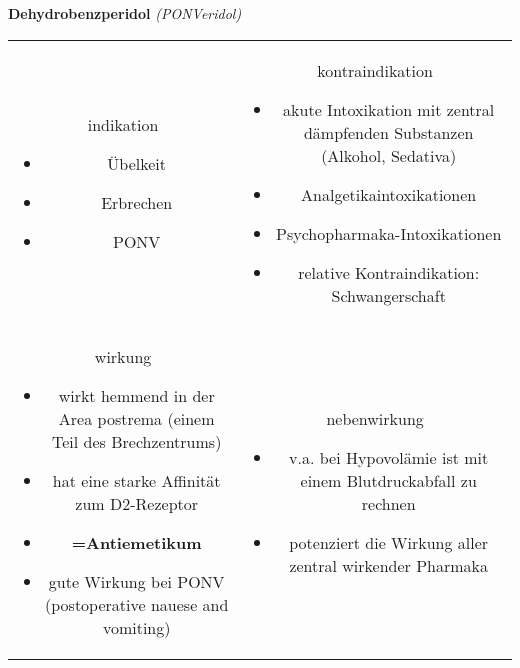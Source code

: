 \begin{frame}{
    \textbf{Dehydrobenzperidol}
    \textit{(PONVeridol)}
}
    \begin{tabular}{c c}
        \begin{beamercolorbox}[wd=\boxwidth\textwidth,ht=\boxheight\textheight,sep=1em]{indikation}
            \begin{itemize}
                \item Übelkeit
                \item Erbrechen
                \item PONV
            \end{itemize}
        \end{beamercolorbox} & 
        \begin{beamercolorbox}[wd=\boxwidth\textwidth,ht=\boxheight\textheight,sep=1em]{kontraindikation}
            \begin{itemize}
                \item akute Intoxikation mit zentral dämpfenden Substanzen (Alkohol, Sedativa) 
                \item Analgetikaintoxikationen
                \item Psychopharmaka-Intoxikationen
                \item relative Kontraindikation: Schwangerschaft
            \end{itemize}
        \end{beamercolorbox} \\
        \begin{beamercolorbox}[wd=\boxwidth\textwidth,ht=\boxheight\textheight,sep=1em]{wirkung}
            \begin{itemize}
                \item wirkt hemmend in der Area postrema (einem Teil des Brechzentrums)
                \item hat eine starke Affinität zum D2-Rezeptor
                \item \textbf{=Antiemetikum}
                \item gute Wirkung bei PONV (postoperative nauese and vomiting)
            \end{itemize}
        \end{beamercolorbox} & 
        \begin{beamercolorbox}[wd=\boxwidth\textwidth,ht=\boxheight\textheight,sep=1em]{nebenwirkung}
            \begin{itemize}
                \item v.a. bei Hypovolämie ist mit einem Blutdruckabfall zu rechnen
                \item potenziert die Wirkung aller zentral wirkender Pharmaka
            \end{itemize}
        \end{beamercolorbox} \\
    \end{tabular}
\end{frame}

